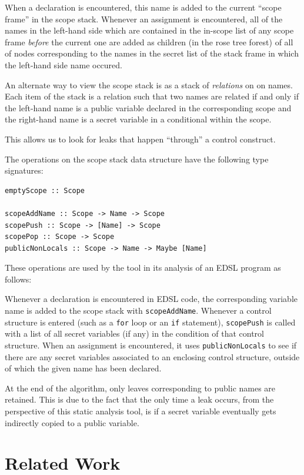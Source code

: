 \documentclass[10pt, conference]{IEEEtran}
\newcommand{\ttt}{\texttt}
\begin{document}
When a declaration is encountered, this name is added to the current ``scope
frame'' in the scope stack. Whenever an assignment is encountered, all of the
names in the left-hand side which are contained in the in-scope list of any
scope frame \textit{before} the current one are added as children (in the rose
tree forest) of all of nodes corresponding to the names in the secret list of
the stack frame in which the left-hand side name occured.

An alternate way to view the scope stack is as a stack of \textit{relations} on
on names. Each item of the stack is a relation such that two names are related
if and only if the left-hand name is a public variable declared in the corresponding
scope and the right-hand name is a secret variable in a conditional within the scope.

This allows us to look for leaks that happen ``through'' a control construct.

The operations on the scope stack data structure have the following type signatures:

\begin{lstlisting}
emptyScope :: Scope

scopeAddName :: Scope -> Name -> Scope
scopePush :: Scope -> [Name] -> Scope
scopePop :: Scope -> Scope
publicNonLocals :: Scope -> Name -> Maybe [Name]
\end{lstlisting}

\noindent These operations are used by the tool in its analysis of an EDSL
program as follows:

Whenever a declaration is encountered in EDSL code, the corresponding variable
name is added to the scope stack with \ttt{scopeAddName}. Whenever a control
structure is entered (such as a \ttt{for} loop or an \ttt{if} statement),
\ttt{scopePush} is called with a list of all secret variables (if any) in the
condition of that control structure. When an assignment is encountered, it
uses \ttt{publicNonLocals} to see if there are any secret variables associated
to an enclosing control structure, outside of which the given name has been declared.

At the end of the algorithm, only leaves corresponding to public names are
retained. This is due to the fact that the only time a leak occurs, from the
perspective of this static analysis tool, is if a secret variable eventually
gets indirectly copied to a public variable.


\section{Related Work}
\label{sec:RelatedWork}
\end{document}
